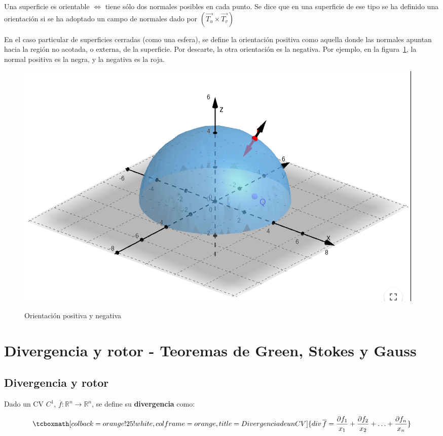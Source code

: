 \documentclass{article}
\renewcommand{\Bbb}{\mathbb}
\begin{document}
Una superficie es orientable $\Leftrightarrow$ tiene sólo dos normales posibles en cada punto. Se dice que en una superficie de ese tipo se ha definido una orientación si se ha adoptado un campo de normales dado por $( \overrightarrow{T_u} \times \overrightarrow{T_v} )$

En el caso particular de superficies cerradas (como una esfera), se define la orientación positiva como aquella donde las normales apuntan hacia la región no acotada, o externa, de la superficie. Por descarte, la otra orientación es la negativa. Por ejemplo, en la figura~\ref{fig:son}, la normal positiva es la negra, y la negativa es la roja.

\begin{figure}[ht]
\centering
\caption{Orientación positiva y negativa}
\includegraphics[scale=0.6]{img/integrales/superficie_orientable.png}
\label{fig:son}
\end{figure}

\section{Divergencia y rotor - Teoremas de Green, Stokes y Gauss}

\subsection{Divergencia y rotor}

Dado un CV $C^1$, $\overline{f}: \Bbb R^n \rightarrow \Bbb R^n$, se define su \textbf{divergencia} como:

\begin{equation}
\tcboxmath[colback=orange!25!white,colframe=orange, title=Divergencia de un CV]
{ \mathop{div} \overline{f} = \frac{\partial f_1}{x_1} + \frac{\partial f_2}{x_2} + \ldots + \frac{\partial f_n}{x_n} }
\end{equation}
\end{document}
